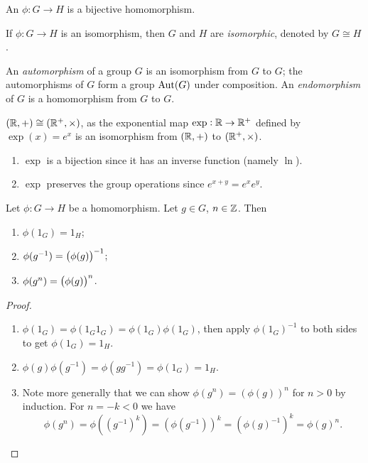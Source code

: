 \begin{definition}[Isomorphism]
An  $\phi:G\to H$ is a bijective homomorphism.

If $\phi:G\to H$ is an isomorphism, then $G$ and $H$ are \emph{isomorphic}, denoted by $G\cong H$.
\end{definition}

An \emph{automorphism} of a group $G$ is an isomorphism from $G$ to $G$; the automorphisms of $G$ form a group $\operatorname{Aut}(G)$ under composition. An \emph{endomorphism} of $G$ is a homomorphism from $G$ to $G$.

\begin{example}
$(\mathbb R,+)\cong(\mathbb R^+,\times)$, as the exponential map $\exp:\mathbb R\to\mathbb R^+$ defined by $\exp(x)=e^x$ is an isomorphism from $(\mathbb R,+)$ to $(\mathbb R^+,\times)$.
\begin{enumerate}[label=(\roman*)]
\item $\exp$ is a bijection since it has an inverse function (namely $\ln$).
\item $\exp$ preserves the group operations since $e^{x+y}=e^xe^y$.
\end{enumerate}
\end{example}

\begin{proposition}
Let $\phi:G\to H$ be a homomorphism. Let $g\in G$, $n\in\mathbb Z$. Then
\begin{enumerate}[label=(\roman*)]
\item $\phi(1_G)=1_H$;
\item $\phi(g^{-1})=\left(\phi(g)\right)^{-1}$;
\item $\phi(g^n)=\left(\phi(g)\right)^n$.
\end{enumerate}
\end{proposition}

\begin{proof} \
\begin{enumerate}[label=(\roman*)]
\item $\phi(1_G)=\phi(1_G 1_G)=\phi(1_G)\phi(1_G)$, then apply $\phi(1_G)^{-1}$ to both sides to get $\phi(1_G)=1_H$.

\item $\phi(g)\phi(g^{-1})=\phi(gg^{-1})=\phi(1_G)=1_H$.

\item Note more generally that we can show $\phi(g^n)=(\phi(g))^n$ for $n>0$ by induction. For $n=-k<0$ we have
\[\phi(g^n)=\phi((g^{-1})^k)=(\phi(g^{-1}))^k=(\phi(g)^{-1})^k=\phi(g)^n.\]
\end{enumerate}
\end{proof}

